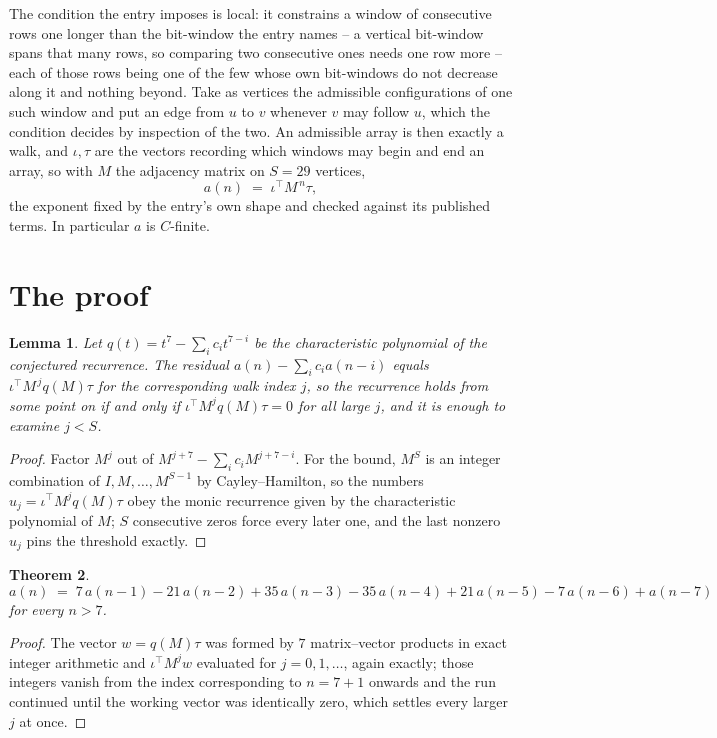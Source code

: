\documentclass[11pt,a4paper]{article}
\theoremstyle{plain}
\newtheorem{theorem}{Theorem}
\newtheorem{lemma}[theorem]{Lemma}
\theoremstyle{definition}
\begin{document}
The condition the entry imposes is local: it constrains a window of consecutive rows one longer than the bit-window the entry names -- a vertical bit-window spans that many rows, so comparing two consecutive ones needs one row more -- each of those rows being one of the few whose own bit-windows do not decrease along it and nothing beyond. Take as vertices the admissible configurations of one such window and put an edge from $u$ to $v$ whenever $v$ may follow $u$, which the condition decides by inspection of the two.
An admissible array is then exactly a walk, and $\iota,\tau$ are the vectors recording which windows may begin and end an array, so with $M$ the adjacency matrix on $S=29$ vertices,
\[
a(n)\;=\;\iota^{\!\top}M^{\,n}\tau ,
\]
the exponent fixed by the entry's own shape and checked against its published terms. In
particular $a$ is $C$-finite.

\section{The proof}

\begin{lemma}\label{lem:crit}
Let $q(t)=t^{7}-\sum_i c_it^{7-i}$ be the characteristic polynomial of the
conjectured recurrence. The residual $a(n)-\sum_ic_ia(n-i)$ equals
$\iota^{\!\top}M^{\,j}q(M)\tau$ for the corresponding walk index $j$, so the recurrence
holds from some point on if and only if $\iota^{\!\top}M^{j}q(M)\tau=0$ for all large $j$,
and it is enough to examine $j<S$.
\end{lemma}

\begin{proof}
Factor $M^{j}$ out of $M^{j+7}-\sum_ic_iM^{j+7-i}$. For the bound, $M^{S}$
is an integer combination of $I,M,\dots,M^{S-1}$ by Cayley--Hamilton, so the numbers
$u_j=\iota^{\!\top}M^{j}q(M)\tau$ obey the monic recurrence given by the characteristic
polynomial of $M$; $S$ consecutive zeros force every later one, and the last nonzero $u_j$
pins the threshold exactly.
\end{proof}

\begin{theorem}
\[
a(n)\;=\;7\,a(n-1) - 21\,a(n-2) + 35\,a(n-3) - 35\,a(n-4) + 21\,a(n-5) - 7\,a(n-6) + a(n-7)
\]
for every $n>7$.
\end{theorem}

\begin{proof}
The vector $w=q(M)\tau$ was formed by $7$ matrix--vector products in exact integer
arithmetic and $\iota^{\!\top}M^{j}w$ evaluated for $j=0,1,\dots$, again exactly; those
integers vanish from the index corresponding to $n=7+1$ onwards and the run continued
until the working vector was identically zero, which settles every larger $j$ at once.
\end{proof}
\end{document}
